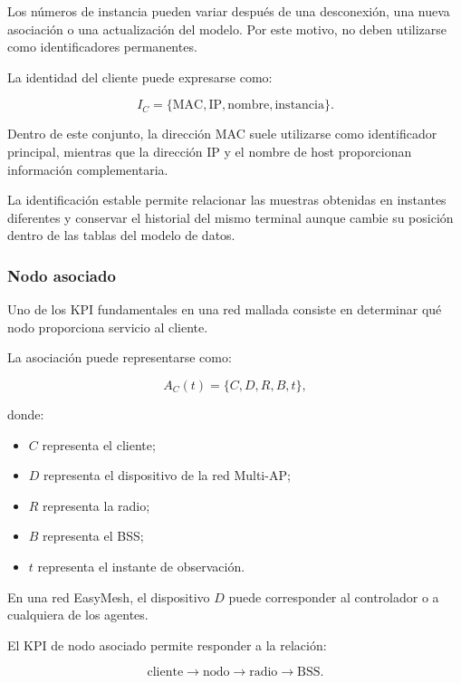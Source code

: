 Los números de instancia pueden variar después de una desconexión, una
nueva asociación o una actualización del modelo. Por este motivo, no
deben utilizarse como identificadores permanentes.

La identidad del cliente puede expresarse como:

\[
    I_C
    =
    \{
        \text{MAC},
        \text{IP},
        \text{nombre},
        \text{instancia}
    \}.
\]

Dentro de este conjunto, la dirección MAC suele utilizarse como
identificador principal, mientras que la dirección IP y el nombre de
host proporcionan información complementaria.

La identificación estable permite relacionar las muestras obtenidas en
instantes diferentes y conservar el historial del mismo terminal aunque
cambie su posición dentro de las tablas del modelo de datos.


\subsubsection*{Nodo asociado}

Uno de los KPI fundamentales en una red mallada consiste en determinar
qué nodo proporciona servicio al cliente.

La asociación puede representarse como:

\[
    A_C(t)
    =
    \{
        C,
        D,
        R,
        B,
        t
    \},
\]

donde:

\begin{itemize}
    \item \(C\) representa el cliente;

    \item \(D\) representa el dispositivo de la red Multi-AP;

    \item \(R\) representa la radio;

    \item \(B\) representa el BSS;

    \item \(t\) representa el instante de observación.
\end{itemize}

En una red EasyMesh, el dispositivo \(D\) puede corresponder al
controlador o a cualquiera de los agentes.

El KPI de nodo asociado permite responder a la relación:

\[
    \text{cliente}
    \longrightarrow
    \text{nodo}
    \longrightarrow
    \text{radio}
    \longrightarrow
    \text{BSS}.
\]

